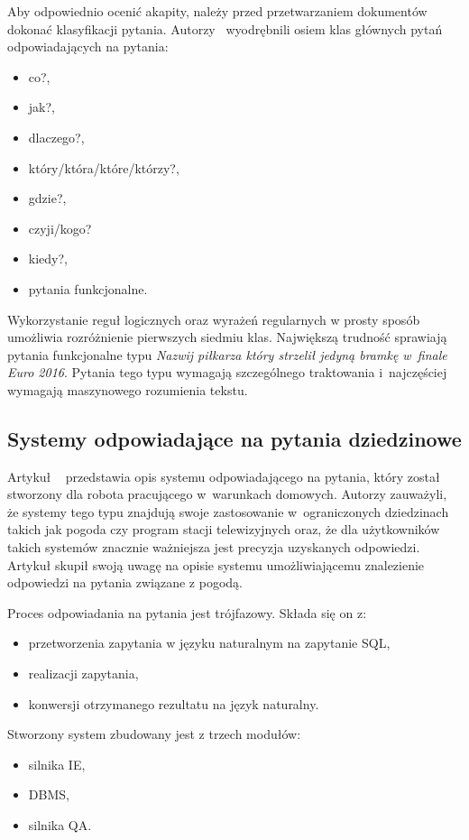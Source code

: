 Aby odpowiednio ocenić akapity, należy przed przetwarzaniem dokumentów dokonać klasyfikacji pytania. Autorzy~\cite{gupta2012survey} wyodrębnili osiem klas głównych pytań odpowiadających na pytania:
\begin{itemize}
	\item co?,
	\item jak?,
	\item dlaczego?,
	\item który/która/które/którzy?,
	\item gdzie?,
	\item czyji/kogo?
	\item kiedy?,
	\item pytania funkcjonalne.
\end{itemize}

Wykorzystanie reguł logicznych oraz wyrażeń regularnych w prosty sposób umożliwia rozróżnienie pierwszych siedmiu klas. Największą trudność sprawiają pytania funkcjonalne typu \emph{Nazwij piłkarza który strzelił jedyną bramkę w~finale Euro 2016}. Pytania tego typu wymagają szczególnego traktowania i~najczęściej wymagają maszynowego rozumienia tekstu\cite{gupta2012survey}.

\subsection{Systemy odpowiadające na pytania dziedzinowe}\label{subsec:lit:res}

Artykuł ~\cite{restrictedWeather} przedstawia opis systemu odpowiadającego na pytania, który został stworzony dla robota pracującego w~warunkach domowych. Autorzy zauważyli, że systemy tego typu znajdują swoje zastosowanie w~ograniczonych dziedzinach takich jak pogoda czy program stacji telewizyjnych oraz, że dla użytkowników takich systemów znacznie ważniejsza jest precyzja uzyskanych odpowiedzi. Artykuł skupił swoją uwagę na opisie systemu umożliwiającemu znalezienie odpowiedzi na pytania związane z pogodą. 

Proces odpowiadania na pytania jest trójfazowy. Składa się on z: 
\begin{itemize}
	\item przetworzenia zapytania w języku naturalnym na zapytanie SQL,
	\item realizacji zapytania,
	\item konwersji otrzymanego rezultatu na język naturalny.
\end{itemize}
Stworzony system zbudowany jest z trzech modułów: 
\begin{itemize}
	\item silnika IE, 
	\item DBMS, 
	\item silnika QA.
\end{itemize}


